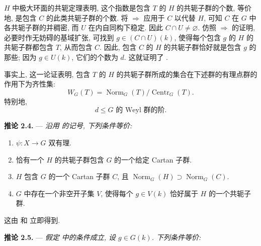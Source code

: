 \(H\) 中极大环面的共轭定理表明, 这个指数是包含 \(T\) 的 \(H\) 的共轭子群的个数, 等价地, 是包含 \(C\) 的此类共轭子群的个数. 将  \(\Rightarrow\)  应用于 \(C\) 以代替 \(H\), 可知 \(C\) 在 \(G\) 中各共轭子群的并稠密, 而 \(U\) 在内自同构下稳定. 因此 \(C\cap U\neq\varnothing\). 仿照  \(\Rightarrow\)  的证明, 必要时作无妨碍的基域扩张, 可找到 \(g\in(C\cap U)(k)\), 使得每个包含 \(g\) 的 \(H\) 的共轭子群都包含 \(T\), 从而包含 \(C\). 因此, 包含 \(C\) 的 \(H\) 的共轭子群恰好就是包含 \(g\) 的那些; 因为 \(g\in U(k)\), 它们的个数为 \(d\). 这就证明了 .

事实上, 这一论证表明, 包含 \(T\) 的 \(H\) 的共轭子群所成的集合在下述群的有理点群的作用下为齐性集:
\[
  W_G(T)=
  \operatorname{Norm}_G(T)/\operatorname{Centr}_G(T).
\]
特别地,
\[
  d\leq\text{\(G\) 的 Weyl 群的阶}.
\]

\medskip
\noindent{}\textbf{推论 2.4.} ---
\textit{沿用  的记号, 下列条件等价:}

\begin{enumerate}
\item[(i)] 
  \(\psi:X\to G\) 双有理.
\item[(ii)] 
  恰有一个 \(H\) 的共轭子群包含 \(G\) 的一个给定 Cartan 子群.
\item[(iii)] 
  \(H\) 包含 \(G\) 的一个 Cartan 子群 \(C\), 且 \(\operatorname{Norm}_G(H)\supset\operatorname{Norm}_G(C)\).
\item[(iv)] 
  \(G\) 中存在一个非空开子集 \(V\), 使得每个 \(g\in V(k)\) 恰好属于 \(H\) 的一个共轭子群.
\end{enumerate}

这由  和  立即得到.

\medskip
\noindent{}\textbf{推论 2.5.} ---
\textit{假定  中的条件成立, 设 \(g\in G(k)\). 下列条件等价:}

